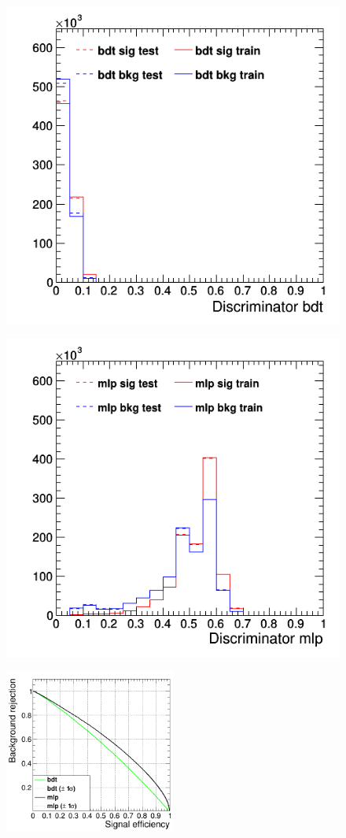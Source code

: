 \documentclass[11pt]{scrartcl}
\begin{document}
	\begin{figure}[H]
	\centering
	\begin{minipage}{.5\textwidth}
	  \centering
	  \includegraphics[width=0.75\linewidth]{figures/MVA/select2/config3/discriminator_bdt.png}
	  \label{fig:distr_s2_config3_bdt}
	\end{minipage}%
	\begin{minipage}{.5\textwidth}
	  \centering
	  \includegraphics[width=0.75\linewidth]{figures/MVA/select2/config3/discriminator_mlp.png}
	  \label{fig:distr_s2_config3_mlp}
	\end{minipage}
	\centering
	\includegraphics[width=0.5\textwidth]{figures/MVA/select2/config3/FOM_selection2_nL10_nT1000_mD5_nC50.png}

\end{figure}
\end{document}
